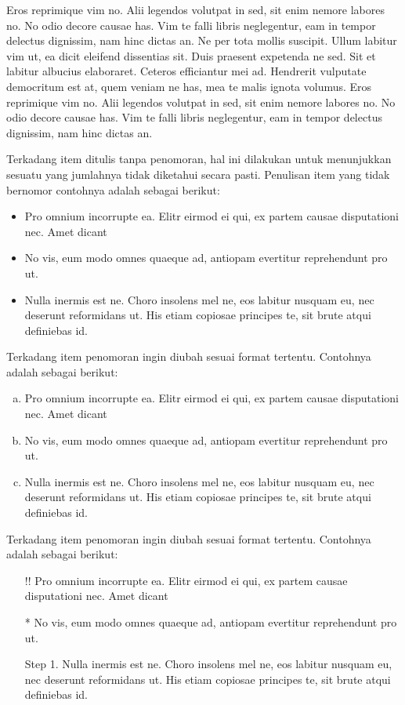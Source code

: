 Eros reprimique vim no. Alii legendos volutpat in sed, sit enim nemore labores no. No odio decore causae has. Vim te falli libris neglegentur, eam in tempor delectus dignissim, nam hinc dictas an. Ne per tota mollis suscipit. Ullum labitur vim ut, ea dicit eleifend dissentias sit. Duis praesent expetenda ne sed. Sit et labitur albucius elaboraret. Ceteros efficiantur mei ad. Hendrerit vulputate democritum est at, quem veniam ne has, mea te malis ignota volumus. Eros reprimique vim no. Alii legendos volutpat in sed, sit enim nemore labores no. No odio decore causae has. Vim te falli libris neglegentur, eam in tempor delectus dignissim, nam hinc dictas an.

Terkadang item ditulis tanpa penomoran, hal ini dilakukan untuk menunjukkan sesuatu yang jumlahnya tidak diketahui secara pasti. Penulisan item yang tidak bernomor contohnya adalah sebagai berikut:
\begin{itemize}
    \item Pro omnium incorrupte ea. Elitr eirmod ei qui, ex partem causae disputationi nec. Amet dicant
    \item No vis, eum modo omnes quaeque ad, antiopam evertitur reprehendunt pro ut.
    \item Nulla inermis est ne. Choro insolens mel ne, eos labitur nusquam eu, nec deserunt reformidans ut. His etiam copiosae principes te, sit brute atqui definiebas id.
\end{itemize}

Terkadang item penomoran ingin diubah sesuai format tertentu. Contohnya adalah sebagai berikut:
\begin{enumerate}[a).]
    \item Pro omnium incorrupte ea. Elitr eirmod ei qui, ex partem causae disputationi nec. Amet dicant
    \item No vis, eum modo omnes quaeque ad, antiopam evertitur reprehendunt pro ut.
    \item Nulla inermis est ne. Choro insolens mel ne, eos labitur nusquam eu, nec deserunt reformidans ut. His etiam copiosae principes te, sit brute atqui definiebas id.
\end{enumerate}

Terkadang item penomoran ingin diubah sesuai format tertentu. Contohnya adalah sebagai berikut:
\begin{itemize}
    \item[!!] Pro omnium incorrupte ea. Elitr eirmod ei qui, ex partem causae disputationi nec. Amet dicant
    \item[*] No vis, eum modo omnes quaeque ad, antiopam evertitur reprehendunt pro ut.
    \item[Step 1.] Nulla inermis est ne. Choro insolens mel ne, eos labitur nusquam eu, nec deserunt reformidans ut. His etiam copiosae principes te, sit brute atqui definiebas id.
\end{itemize}


